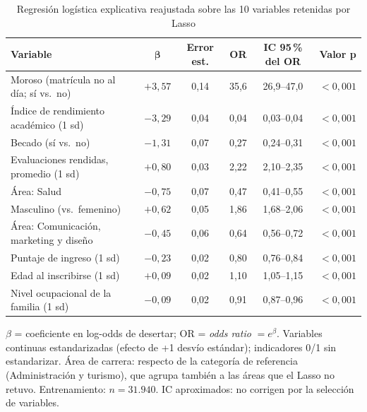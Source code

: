 \documentclass[titlepage,a4paper]{article}
\begin{document}
\begin{table}[!htbp]
\centering
\caption{Regresión logística explicativa reajustada sobre las 10 variables retenidas por Lasso}
\label{tab:explicativo}
\footnotesize
\begin{tabular}{lccccc}
\toprule
\textbf{Variable} & $\boldsymbol{\beta}$ & \textbf{Error est.} & \textbf{OR} & \textbf{IC 95\,\% del OR} & \textbf{Valor p} \\
\midrule
Moroso (matrícula no al día; sí vs.\ no)  & $+3{,}57$ & 0,14 & 35,6 & 26,9--47,0 & $<0{,}001$ \\
Índice de rendimiento académico (1 sd)     & $-3{,}29$ & 0,04 & 0,04 & 0,03--0,04 & $<0{,}001$ \\
Becado (sí vs.\ no)                        & $-1{,}31$ & 0,07 & 0,27 & 0,24--0,31 & $<0{,}001$ \\
Evaluaciones rendidas, promedio (1 sd)     & $+0{,}80$ & 0,03 & 2,22 & 2,10--2,35 & $<0{,}001$ \\
Área: Salud                                & $-0{,}75$ & 0,07 & 0,47 & 0,41--0,55 & $<0{,}001$ \\
Masculino (vs.\ femenino)                  & $+0{,}62$ & 0,05 & 1,86 & 1,68--2,06 & $<0{,}001$ \\
Área: Comunicación, marketing y diseño     & $-0{,}45$ & 0,06 & 0,64 & 0,56--0,72 & $<0{,}001$ \\
Puntaje de ingreso (1 sd)                  & $-0{,}23$ & 0,02 & 0,80 & 0,76--0,84 & $<0{,}001$ \\
Edad al inscribirse (1 sd)                 & $+0{,}09$ & 0,02 & 1,10 & 1,05--1,15 & $<0{,}001$ \\
Nivel ocupacional de la familia (1 sd)     & $-0{,}09$ & 0,02 & 0,91 & 0,87--0,96 & $<0{,}001$ \\
\bottomrule
\end{tabular}

\vspace{2pt}
{\scriptsize $\beta$ = coeficiente en log-odds de desertar; OR = \textit{odds ratio} $= e^{\beta}$. Variables continuas estandarizadas (efecto de +1 desvío estándar); indicadores 0/1 sin estandarizar. Área de carrera: respecto de la categoría de referencia (Administración y turismo), que agrupa también a las áreas que el Lasso no retuvo. Entrenamiento: $n = 31.940$. IC aproximados: no corrigen por la selección de variables.\par}
\end{table}
\end{document}
